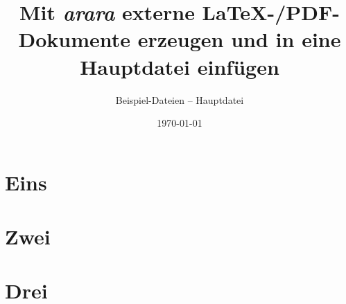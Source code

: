 \documentclass[12pt, headings=small]{scrreprt}
\title{Mit \emph{arara} externe LaTeX-/PDF-Dokumente erzeugen und in eine Hauptdatei einfügen}
\subtitle{Beispiel-Dateien -- Hauptdatei}
\author{}
\date{\today}
\begin{document}
\maketitle
\tableofcontents
  \chapter{Eins}
		\label{cha:Eins}
		\blindtext[2]

		\blindtext[2]

	\chapter{Zwei}
		\label{cha:Zwei}
		\blindtext[2]
		
		\blindtext[2]
	\chapter{Drei}
		\label{cha:Drei}
		\blindtext[2]
		
		\blindtext[2]

	
	
	
\end{document}
